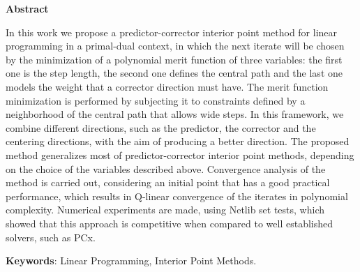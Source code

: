 \begin{center}
  \large{\textbf{Abstract}}
\end{center}




In this work we propose a predictor-corrector interior point method for linear programming in a primal-dual context, in which the next iterate will be chosen by the minimization of a polynomial merit function  of three variables: the first one is the step length, the second one defines the central path and the last one models the weight that a corrector direction must have. The merit function minimization is performed by subjecting it to constraints defined by a neighborhood of the central path that allows wide steps. In this framework, we combine  different directions, such as the predictor, the corrector and the centering directions, with the aim of producing a better direction. The proposed method generalizes most of predictor-corrector interior point methods, depending on the choice of the variables described above. Convergence analysis of the method is carried out,  considering an initial point that has a good practical performance, which results in Q-linear convergence of the iterates in polynomial complexity. Numerical experiments are made, using Netlib set tests, which  showed that this approach is competitive when compared to  well established solvers, such as PCx.






\vspace{.5cm}
\textbf{Keywords}:
Linear Programming, Interior Point Methods.
